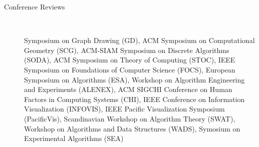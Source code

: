 \documentclass[10pt]{article}
\begin{document}
\begin{description}
\vspace{-.4cm}\item [Conference Reviews]\

Symposium on Graph Drawing (GD), ACM Symposium on Computational Geometry (SCG), ACM-SIAM Symposium on Discrete Algorithms (SODA), ACM Symposium on Theory of Computing (STOC), IEEE Symposium on Foundations of Computer Science (FOCS), European Symposium on Algorithms (ESA), Workshop on Algorithm Engineering and Experiments (ALENEX), ACM SIGCHI Conference on Human Factors in Computing Systems (CHI), IEEE Conference on Information Visualization (INFOVIS), IEEE Pacific Visualization Symposium (PacificVis), 
Scandinavian Workshop on Algorithm Theory (SWAT), Workshop on Algorithms and Data Structures (WADS), Symosium on Experimental Algorithms (SEA)


%

\begin{comment}
\item [Invited Talks]\

\begin{enumerate}


\end{comment}
\end{description}
\end{document}
